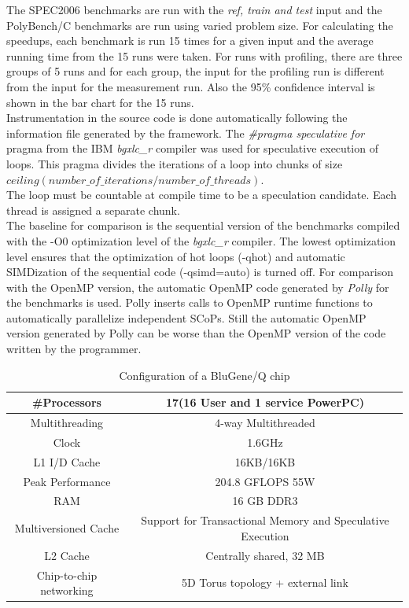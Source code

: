 \documentclass[10pt]{report}          %
\begin{document}
The SPEC2006 benchmarks are run with the \textit{ref, train and test} input and the PolyBench/C benchmarks are run using varied problem size.  For calculating the speedups, each benchmark is run 15 times for a given input and the average running time from the 15 runs were taken. For runs with profiling, there are three groups of 5 runs and for each group, the input for the profiling run is different from the input for the measurement run. Also the 95\% confidence interval is shown in the bar chart for the 15 runs.\\

Instrumentation in the source code is done automatically following the information file generated by the framework.  The \textit{\#pragma speculative for} pragma from the IBM \textit{bgxlc\_r} compiler was used for speculative execution of loops.  This pragma divides the iterations of a loop into chunks of size
$ceiling(number\_of\_iterations/number\_of\_threads)$. \\

The loop must be countable at compile time to be a speculation candidate.  Each thread is assigned a separate chunk.\\

The baseline for comparison is the sequential version of the benchmarks compiled with the -O0 optimization level of the \textit{bgxlc\_r} compiler.  The lowest optimization level ensures that the optimization of hot loops (-qhot) and automatic SIMDization of the sequential code (-qsimd=auto) is turned off. For comparison with the OpenMP version, the automatic OpenMP code generated by \textit{Polly} for the benchmarks is used.  Polly inserts calls to OpenMP runtime functions to automatically parallelize independent SCoPs. Still the automatic OpenMP version generated by Polly can be worse than the OpenMP version of the code written by the programmer.


\begin{table}
\centering
\caption{Configuration of a BluGene/Q chip}
\begin{tabular}{|c||c|} \hline
\#Processors&17(16 User and 1 service PowerPC)\\ \hline 
Multithreading&4-way Multithreaded \\ \hline
Clock&1.6GHz \\ \hline
L1 I/D Cache&16KB/16KB \\ \hline
Peak Performance & 204.8 GFLOPS \@ 55W \\ \hline
RAM&16 GB DDR3 \\ \hline
Multiversioned Cache & Support for Transactional Memory and Speculative Execution \\ \hline
L2 Cache & Centrally shared, 32 MB \\ \hline
Chip-to-chip networking & 5D Torus topology + external link \\ \hline
\hline\end{tabular}
\label{table:bgq_config}
\end{table}
\end{document}
